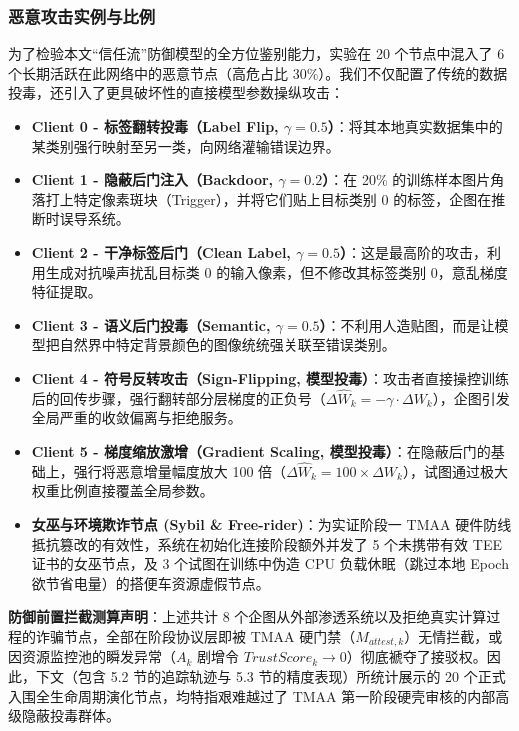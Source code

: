 \documentclass[runningheads]{llncs}
\begin{document}
\subsubsection{恶意攻击实例与比例}
为了检验本文“信任流”防御模型的全方位鉴别能力，实验在 20 个节点中混入了 6 个长期活跃在此网络中的恶意节点（高危占比 30\%）。我们不仅配置了传统的数据投毒，还引入了更具破坏性的直接模型参数操纵攻击：
\begin{itemize}
    \item \textbf{Client 0 - 标签翻转投毒（Label Flip, $\gamma=0.5$）}：将其本地真实数据集中的某类别强行映射至另一类，向网络灌输错误边界。
    \item \textbf{Client 1 - 隐蔽后门注入（Backdoor, $\gamma=0.2$）}：在 20\% 的训练样本图片角落打上特定像素斑块（Trigger），并将它们贴上目标类别 $0$ 的标签，企图在推断时误导系统。
    \item \textbf{Client 2 - 干净标签后门（Clean Label, $\gamma=0.5$）}：这是最高阶的攻击，利用生成对抗噪声扰乱目标类 $0$ 的输入像素，但不修改其标签类别 0，意乱梯度特征提取。
    \item \textbf{Client 3 - 语义后门投毒（Semantic, $\gamma=0.5$）}：不利用人造贴图，而是让模型把自然界中特定背景颜色的图像统统强关联至错误类别。
    \item \textbf{Client 4 - 符号反转攻击（Sign-Flipping, 模型投毒）}：攻击者直接操控训练后的回传步骤，强行翻转部分层梯度的正负号（$\Delta \widehat{W}_k = - \gamma \cdot \Delta W_k$），企图引发全局严重的收敛偏离与拒绝服务。
    \item \textbf{Client 5 - 梯度缩放激增（Gradient Scaling, 模型投毒）}：在隐蔽后门的基础上，强行将恶意增量幅度放大 100 倍（$\Delta \widehat{W}_k = 100 \times \Delta W_k$），试图通过极大权重比例直接覆盖全局参数。
    \item \textbf{女巫与环境欺诈节点 (Sybil \& Free-rider)}：为实证阶段一 TMAA 硬件防线抵抗篡改的有效性，系统在初始化连接阶段额外并发了 5 个未携带有效 TEE 证书的女巫节点，及 3 个试图在训练中伪造 CPU 负载休眠（跳过本地 Epoch 欲节省电量）的搭便车资源虚假节点。
\end{itemize}

\textbf{防御前置拦截测算声明}：上述共计 8 个企图从外部渗透系统以及拒绝真实计算过程的诈骗节点，全部在阶段协议层即被 TMAA 硬门禁（$M_{attest,k}$）无情拦截，或因资源监控池的瞬发异常（$A_k$ 剧增令 $TrustScore_k \to 0$）彻底褫夺了接驳权。因此，下文（包含 5.2 节的追踪轨迹与 5.3 节的精度表现）所统计展示的 20 个正式入围全生命周期演化节点，均特指艰难越过了 TMAA 第一阶段硬壳审核的内部高级隐蔽投毒群体。
\end{document}
